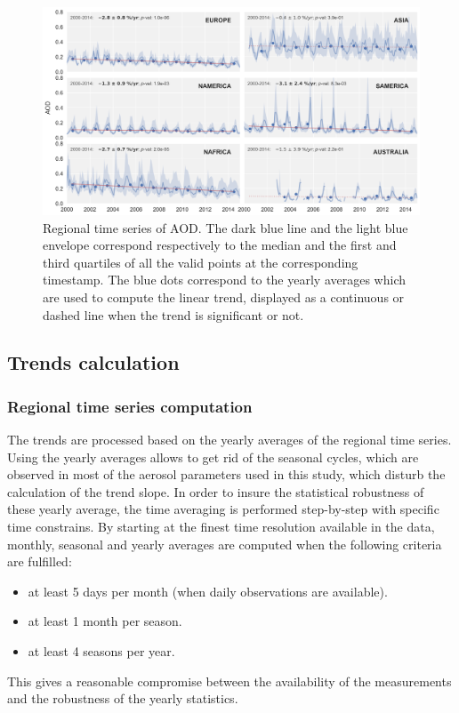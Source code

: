 \documentclass[journal abbreviation, manuscript]{copernicus}
\begin{document}
\begin{figure}
 \includegraphics[width=16cm]{../scripts/figs/ts/panel-od550aer.png}
 \caption{Regional time series of AOD. The dark blue line and the light blue envelope correspond respectively to the median and the first and third quartiles of all the valid points at the corresponding timestamp. The blue dots correspond to the yearly averages which are used to compute the linear trend, displayed as a continuous or dashed line when the trend is significant or not.}
 \label{fig:ts_aod}
\end{figure}


\subsection{Trends calculation}

\subsubsection{Regional time series computation}
The trends are processed based on the yearly averages of the regional time series. Using the yearly averages allows to get rid of the seasonal cycles, which are observed in most of the aerosol parameters used in this study, which disturb the calculation of the trend slope. In order to insure the statistical robustness of these yearly average, the time averaging is performed step-by-step with specific time constrains. By starting at the finest time resolution available in the data, monthly, seasonal and yearly averages are computed when the following criteria are fulfilled:
\begin{itemize}
 \item at least 5 days per month (when daily observations are available).
 \item at least 1 month per season.
 \item at least 4 seasons per year.
\end{itemize}
This gives a reasonable compromise between the availability of the measurements and the robustness of the yearly statistics.
\end{document}
